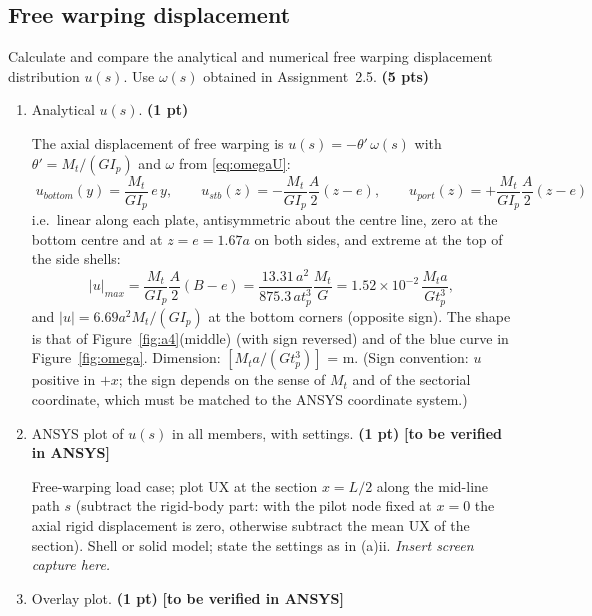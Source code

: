 \subsection{Free warping displacement}

Calculate and compare the analytical and numerical free warping displacement distribution $u(s)$. Use $\omega(s)$ obtained in Assignment~2.5. \textbf{(5 pts)}

\begin{enumerate}[label=\roman*.]
  \item Analytical $u(s)$. \textbf{(1 pt)}

  The axial displacement of free warping is $u(s)=-\theta'\,\omega(s)$ with $\theta'=M_t/(GI_p)$ and $\omega$ from \eqref{eq:omegaU}:
  \begin{equation}
    \boxed{\;u_{bottom}(y)=\frac{M_t}{GI_p}\,e\,y,\qquad u_{stb}(z)=-\frac{M_t}{GI_p}\frac{A}{2}(z-e),\qquad u_{port}(z)=+\frac{M_t}{GI_p}\frac{A}{2}(z-e)\;}
  \end{equation}
  i.e.\ linear along each plate, antisymmetric about the centre line, zero at the bottom centre and at $z=e=1.67a$ on both sides, and extreme at the top of the side shells:
  \begin{equation}
    |u|_{max}=\frac{M_t}{GI_p}\frac{A}{2}(B-e)=\frac{13.31\,a^2}{875.3\,at_p^3}\frac{M_t}{G}=1.52\times10^{-2}\,\frac{M_ta}{Gt_p^3},
  \end{equation}
  and $|u|=6.69a^2M_t/(GI_p)$ at the bottom corners (opposite sign). The shape is that of Figure~\ref{fig:a4}(middle) (with sign reversed) and of the blue curve in Figure~\ref{fig:omega}. Dimension: $[M_ta/(Gt_p^3)]$ = m. (Sign convention: $u$ positive in $+x$; the sign depends on the sense of $M_t$ and of the sectorial coordinate, which must be matched to the ANSYS coordinate system.)

  \item ANSYS plot of $u(s)$ in all members, with settings. \textbf{(1 pt)} \textbf{[to be verified in ANSYS]}

  Free-warping load case; plot UX at the section $x=L/2$ along the mid-line path $s$ (subtract the rigid-body part: with the pilot node fixed at $x=0$ the axial rigid displacement is zero, otherwise subtract the mean UX of the section). Shell or solid model; state the settings as in (a)ii. \emph{Insert screen capture here.}

  \item Overlay plot. \textbf{(1 pt)} \textbf{[to be verified in ANSYS]}


\end{enumerate}
